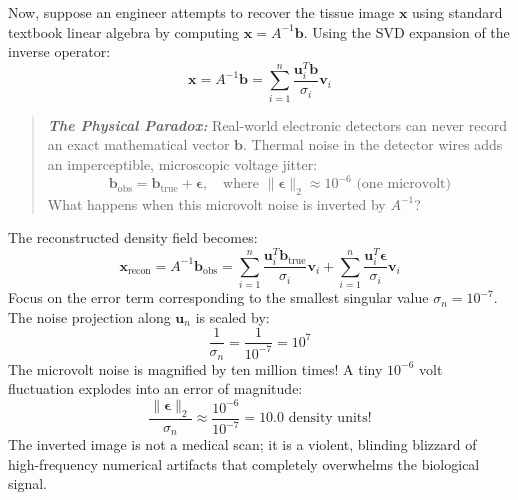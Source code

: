 Now, suppose an engineer attempts to recover the tissue image $\mathbf{x}$ using standard textbook linear algebra by computing $\mathbf{x} = A^{-1} \mathbf{b}$. Using the SVD expansion of the inverse operator:
\begin{equation}
\mathbf{x} = A^{-1} \mathbf{b} = \sum_{i=1}^n \frac{\mathbf{u}_i^T \mathbf{b}}{\sigma_i} \mathbf{v}_i
\end{equation}

\begin{quote}
\textit{\textbf{The Physical Paradox:}} Real-world electronic detectors can never record an exact mathematical vector $\mathbf{b}$. Thermal noise in the detector wires adds an imperceptible, microscopic voltage jitter:
\begin{equation}
\mathbf{b}_{\text{obs}} = \mathbf{b}_{\text{true}} + \boldsymbol{\epsilon}, \quad \text{where } \|\boldsymbol{\epsilon}\|_2 \approx 10^{-6} \text{ (one microvolt)}
\end{equation}
What happens when this microvolt noise is inverted by $A^{-1}$?
\end{quote}

The reconstructed density field becomes:
\begin{equation}
\mathbf{x}_{\text{recon}} = A^{-1} \mathbf{b}_{\text{obs}} = \sum_{i=1}^n \frac{\mathbf{u}_i^T \mathbf{b}_{\text{true}}}{\sigma_i} \mathbf{v}_i + \sum_{i=1}^n \frac{\mathbf{u}_i^T \boldsymbol{\epsilon}}{\sigma_i} \mathbf{v}_i
\end{equation}
Focus on the error term corresponding to the smallest singular value $\sigma_n = 10^{-7}$. The noise projection along $\mathbf{u}_n$ is scaled by:
\begin{equation}
\frac{1}{\sigma_n} = \frac{1}{10^{-7}} = 10^7
\end{equation}
The microvolt noise is magnified by ten million times! A tiny $10^{-6}$ volt fluctuation explodes into an error of magnitude:
\begin{equation}
\frac{\|\boldsymbol{\epsilon}\|_2}{\sigma_n} \approx \frac{10^{-6}}{10^{-7}} = 10.0 \text{ density units!}
\end{equation}
The inverted image is not a medical scan; it is a violent, blinding blizzard of high-frequency numerical artifacts that completely overwhelms the biological signal.

